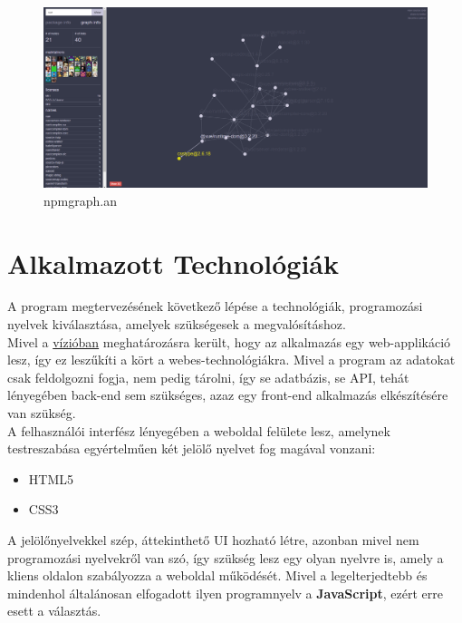	\begin{figure}[!h]
		\centering
		\includegraphics[scale=0.2]{images/anvaka_npmgraph.png}
		\caption{npmgraph.an}
		\label{fig:sw-npmgraph}
	\end{figure}
	
	\pagebreak

\section{Alkalmazott Technológiák}

A program megtervezésének következő lépése a technológiák, programozási nyelvek kiválasztása, amelyek szükségesek a megvalósításhoz.\\

Mivel a \hyperlink{section.2.2}{vízióban} meghatározásra került, hogy az alkalmazás egy web-applikáció lesz, így ez leszűkíti a kört a webes-technológiákra. Mivel a program az adatokat csak feldolgozni fogja, nem pedig tárolni, így se adatbázis, se API, tehát lényegében back-end sem szükséges, azaz egy front-end alkalmazás elkészítésére van szükség.\\

A felhasználói interfész lényegében a weboldal felülete lesz, amelynek testreszabása egyértelműen két jelölő nyelvet fog magával vonzani:
\begin{itemize}
	\item HTML5
	\item CSS3
\end{itemize}

A jelölőnyelvekkel szép, áttekinthető UI hozható létre, azonban mivel nem programozási nyelvekről van szó, így szükség lesz egy olyan nyelvre is, amely a kliens oldalon szabályozza a weboldal működését. Mivel a legelterjedtebb és mindenhol általánosan elfogadott ilyen programnyelv a \textbf{JavaScript}, ezért erre esett a választás.\\

